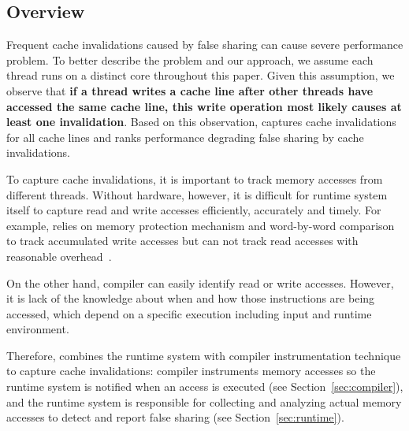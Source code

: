\label{sec:detection}

\subsection{Overview}
\label{sec:overview}
Frequent cache invalidations caused by false sharing can cause severe performance problem.
To better describe the problem and our approach, we assume each thread runs on a distinct core throughout this paper. Given this assumption, we observe that 
\textbf{if a thread writes a cache line after other threads have 
accessed the same cache line, this write operation most likely causes at least
one invalidation}. 
Based on this observation, \Defaults{} captures cache invalidations for all cache lines and 
ranks performance degrading false sharing by cache invalidations.
 
To capture cache invalidations, it is important to track memory accesses from different 
threads. 
Without hardware, however, it is difficult for runtime system itself to capture read and write accesses efficiently, accurately and timely. 
For example, \Sheriff{} relies on memory protection mechanism and word-by-word
comparison to track accumulated write accesses but can not track read accesses with  
reasonable overhead~\cite{sheriff}. 


On the other hand, compiler can easily identify  
read or write accesses. However,
it is lack of the knowledge about when and how those instructions are being accessed, 
which depend on a specific execution including input and runtime environment. 

Therefore,  combines the runtime system with compiler instrumentation technique to capture 
cache invalidations: compiler instruments memory accesses so the runtime
system is notified when an access is executed (see Section~\ref{sec:compiler}),
and the runtime system is responsible for collecting and analyzing actual memory accesses 
to detect and report false sharing (see Section~\ref{sec:runtime}).

